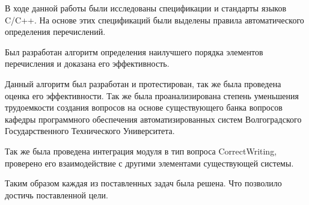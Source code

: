 \documentclass[a4paper,english,russian]{G2-105}
\begin{document}
\newpage
{}
\par В ходе данной работы были исследованы спецификации и стандарты языков C/C++. На основе этих спецификаций были выделены правила автоматического определения перечислений.
\par Был разработан алгоритм определения наилучшего порядка элементов перечисления и доказана его эффективность.
\par Данный алгоритм был разработан и протестирован, так же была проведена оценка его эффективности. Так же была проанализирована степень уменьшения трудоемкости создания вопросов на основе существующего банка вопросов кафедры программного обеспечения автоматизированных систем Волгоградского Государственного Технического Университета.
\par Так же была проведена интеграция модуля в тип вопроса CorrectWriting, проверено его взаимодействие с другими элементами существующей системы.
\par Таким образом каждая из поставленных задач была решена. Что позволило достичь поставленной цели.
\newpage
\end{document}
